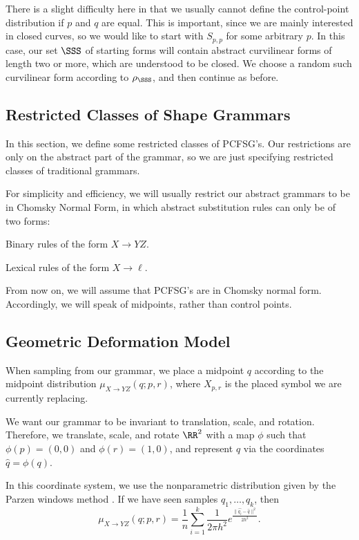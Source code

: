 There is a slight difficulty here in that we usually cannot define the
control-point distribution if $p$ and $q$ are equal. This is
important, since we are mainly interested in closed curves, so we
would like to start with $S_{p,p}$ for some arbitrary $p$. In this
case, our set $\SSS$ of starting forms will contain abstract
curvilinear forms of length two or more, which are understood to be
closed. We choose a random such curvilinear form according to
$\rho_\SSS$, and then continue as before.

\subsection{Restricted Classes of Shape Grammars}

In this section, we define some restricted classes of PCFSG's. Our
restrictions are only on the abstract part of the grammar, so we are
just specifying restricted classes of traditional grammars.

For simplicity and efficiency, we will usually restrict our abstract
grammars to be in Chomsky Normal Form, in which abstract substitution
rules can only be of two forms: 
\bitem
\item Binary rules of the form $X \to Y Z$.
\item Lexical rules of the form $X \to \ell$.
\eitem 

From now on, we will assume that PCFSG's are in Chomsky normal form.
Accordingly, we will speak of midpoints, rather than control points.

\subsection{Geometric Deformation Model}
\label{sec-deform}

When sampling from our grammar, we place a midpoint $q$ according to
the midpoint distribution $\mu_{X\to YZ}(q; p, r)$, where $X_{p,r}$ is
the placed symbol we are currently replacing.

We want our grammar to be invariant to translation, scale, and
rotation. Therefore, we translate, scale, and rotate $\RR^2$ with a
map $\phi$ such that $\phi(p) =(0,0)$ and $\phi(r) =(1,0)$, and
represent $q$ via the coordinates $\widehat{q} = \phi(q)$.

In this coordinate system, we use the nonparametric distribution given
by the Parzen windows method \cite{parzen}. If we have seen samples
$q_1, \dots, q_k$, then
$$\mu_{X\to YZ}(q ; p, r) = \frac{1}{n} \sum_{i=1}^{k}
\frac{1}{2\pi h^2} e^{\frac{\| \widehat{q_i} - \widehat{q}\|^2}{2h^2}}.$$

